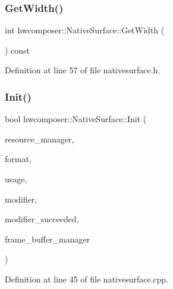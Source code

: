\subsubsection{\texorpdfstring{Get\+Width()}{GetWidth()}}
{\footnotesize\ttfamily int hwcomposer\+::\+Native\+Surface\+::\+Get\+Width (\begin{DoxyParamCaption}{ }\end{DoxyParamCaption}) const\hspace{0.3cm}{\ttfamily [inline]}}



Definition at line 57 of file nativesurface.\+h.


\begin{DoxyCode}{0}
\end{DoxyCode}
\mbox{\label{classhwcomposer_1_1NativeSurface_a6e70cd7f3a013619235dd05934c33930}} 
\subsubsection{\texorpdfstring{Init()}{Init()}}
{\footnotesize\ttfamily bool hwcomposer\+::\+Native\+Surface\+::\+Init (\begin{DoxyParamCaption}\item[{\mbox{\hyperlink{classhwcomposer_1_1ResourceManager}{Resource\+Manager}} $\ast$}]{resource\+\_\+manager,  }\item[{uint32\+\_\+t}]{format,  }\item[{uint32\+\_\+t}]{usage,  }\item[{uint64\+\_\+t}]{modifier,  }\item[{bool $\ast$}]{modifier\+\_\+succeeded,  }\item[{\mbox{\hyperlink{classhwcomposer_1_1FrameBufferManager}{Frame\+Buffer\+Manager}} $\ast$}]{frame\+\_\+buffer\+\_\+manager }\end{DoxyParamCaption})}



Definition at line 45 of file nativesurface.\+cpp.


